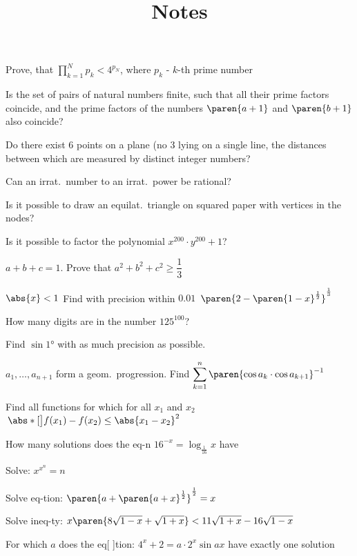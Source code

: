 \documentclass{article}
\title{Notes}
\author{}
\date{}
\begin{document}
\problem  %
Prove, that $\displaystyle{\prod\limits_{k = 1}^{N} {p_k} < 4^{p_N}}$, where $p_k$ - $k$-th prime number


\problem  %
Is the set of pairs of natural numbers finite,  %
such that all their prime factors coincide, and the prime factors of the numbers $\paren{a + 1}$ and $\paren{b + 1}$ also coincide?


\problem  %
Do there exist $6$ points on a plane (no $3$ lying on a single line,
the distances between which are measured by distinct integer numbers?


\problem  %
Can an irrat.\ number to an irrat.\ power be rational?


\problem  %
Is it possible to draw an equilat.\ triangle on squared paper with vertices in the nodes?


\problem  %
Is it possible to factor the polynomial $x^{200} \cdot y^{200} + 1$?


\problem  %
$a + b + c = 1$.
Prove that $a^2 + b^2 + c^2 \geq \dfrac{1}{3}$


\problem  %
$\abs{x} < 1$ Find with precision within $0.01 \,$ $\paren{2 - \paren{1 - x}^{\frac{1}{2}}}^{\frac{1}{3}}$


\problem  %
How many digits are in the number $125^{100}$?


\problem  %
Find $\sin\ang{1}$ with as much precision as possible.


\problem  %
$a_{1}, \dotsc, a_{n + 1}$ form a geom.\ progression.
Find $\displaystyle{\sum\limits_{k = 1}^{n} {\paren{\cos a_{k} \cdot \cos a_{k + 1}}^{- 1}}}$


\problem  %
Find all functions for which for all $x_1$ and $x_2$
$\, \abs*[\big]{f(x_1) - f(x_2)} \leq \abs{x_1 - x_2}^2$


\problem  %
How many solutions does the eq-n $16^{- x} = \log_{\frac{1}{16}}{x}$ have


\problem  %
Solve: $x^{x^n} = n$


\problem  %
Solve eq-tion: $\paren{a + \paren{a + x}^{\frac{1}{2}}}^{\frac{1}{2}} = x$


\problem  %
Solve ineq-ty:
$x \paren{8 \sqrt{1 - x} + \sqrt{1 + x}} < 11 \sqrt{1 + x} - 16 \sqrt{1 - x}$


\problem  %
For which $a$ does the eq[ ]tion: $4^{x} + 2 = a \cdot 2^{x} \sin{a x}$ have exactly one solution
\end{document}
